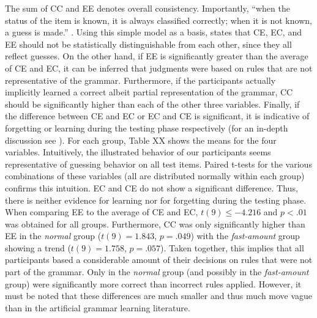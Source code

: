 The sum of CC and EE denotes overall consistency. Importantly, ``when the status of the item is known, it is always classified correctly; when it is not known, a guess is made.'' \citep[p.~227]{reber1989implicit}. Using this simple model as a basis, \citeauthor{reber1989implicit} states that CE, EC, and EE should not be statistically distinguishable from each other, since they all reflect guesses. On the other hand, if EE is significantly greater than the average of CE and EC, it can be inferred that judgments were based on rules that are not representative of the grammar. Furthermore, if the participants actually implicitly learned a correct albeit partial representation of the grammar, CC should be significantly higher than each of the other three variables. Finally, if the difference between CE and EC or EC and CE is significant, it is indicative of forgetting or learning during the testing phase respectively (for an in-depth discussion see \citet{reber1989implicit}). For each group, Table XX shows the means for the four variables. Intuitively, the illustrated behavior of our participants seems representative of guessing behavior on all test items. Paired t-tests for the various combinations of these variables (all are distributed normally within each group) confirms this intuition. EC and CE do not show a significant difference. Thus, there is neither evidence for learning nor for forgetting during the testing phase. When comparing EE to the average of CE and EC, $t(9) \leq -4.216$ and $p < .01$ was obtained for all groups. Furthermore, CC was only significantly higher than EE in the \textit{normal} group ($t(9)=1.843$, $p=.049$) with the \textit{fast-amount} group showing a trend ($t(9)=1.758$, $p=.057$). Taken together, this implies that all participants based a considerable amount of their decisions on rules that were not part of the grammar. Only in the \textit{normal} group (and possibly in the \textit{fast-amount} group) were significantly more correct than incorrect rules applied. However, it must be noted that these differences are much smaller and thus much move vague than in the artificial grammar learning literature.\\
